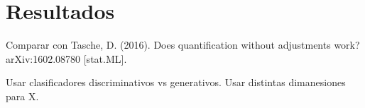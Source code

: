 \chapter{Resultados}\label{resultados}

Comparar con Tasche, D. (2016). Does quantification without adjustments work?
arXiv:1602.08780 [stat.ML].

Usar clasificadores discriminativos vs generativos.
Usar distintas dimanesiones para X.
